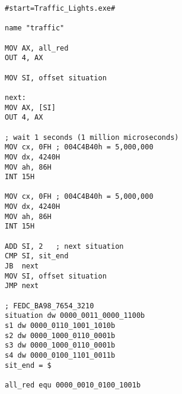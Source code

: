\documentclass{article}
\begin{document}
\begin{lstlisting}[caption={Traffic light system}]
#start=Traffic_Lights.exe#

name "traffic"

MOV AX, all_red
OUT 4, AX

MOV SI, offset situation

next:
MOV AX, [SI]
OUT 4, AX

; wait 1 seconds (1 million microseconds)
MOV cx, 0FH ; 004C4B40h = 5,000,000
MOV dx, 4240H
MOV ah, 86H
INT 15H   

MOV cx, 0FH ; 004C4B40h = 5,000,000
MOV dx, 4240H
MOV ah, 86H
INT 15H

ADD SI, 2   ; next situation
CMP SI, sit_end
JB  next
MOV SI, offset situation
JMP next

; FEDC_BA98_7654_3210
situation dw 0000_0011_0000_1100b
s1 dw 0000_0110_1001_1010b
s2 dw 0000_1000_0110_0001b
s3 dw 0000_1000_0110_0001b
s4 dw 0000_0100_1101_0011b
sit_end = $

all_red equ 0000_0010_0100_1001b

\end{lstlisting}
\end{document}
